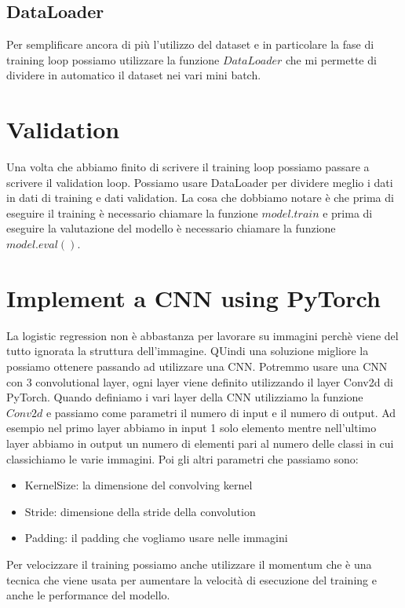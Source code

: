 \documentclass[14pt]{extreport}
\begin{document}
\subsection{DataLoader}

Per semplificare ancora di più l'utilizzo del dataset e in particolare la fase di training loop possiamo utilizzare la funzione $DataLoader$ che mi permette di dividere in automatico il dataset nei vari mini batch.

\section{Validation}

Una volta che abbiamo finito di scrivere il training loop possiamo passare a scrivere il validation loop.
Possiamo usare DataLoader per dividere meglio i dati in dati di training e dati validation.
La cosa che dobbiamo notare è che prima di eseguire il training è necessario chiamare la funzione $model.train$ e prima di eseguire la valutazione del modello è necessario chiamare la funzione $model.eval()$.

\section{Implement a CNN using PyTorch}

La logistic regression non è abbastanza per lavorare su immagini perchè viene del tutto ignorata la struttura dell'immagine. QUindi una soluzione migliore la possiamo ottenere passando ad utilizzare una CNN.
Potremmo usare una CNN con 3 convolutional layer, ogni layer viene definito utilizzando il layer Conv2d di PyTorch.
Quando definiamo i vari layer della CNN utilizziamo la funzione $Conv2d$ e passiamo come parametri il numero di input e il numero di output.
Ad esempio nel primo layer abbiamo in input 1 solo elemento mentre nell'ultimo layer abbiamo in output un numero di elementi pari al numero delle classi in cui classichiamo le varie immagini.
Poi gli altri parametri che passiamo sono:
\begin{itemize}
	\item KernelSize: la dimensione del convolving kernel
	\item Stride: dimensione della stride della convolution
	\item Padding: il padding che vogliamo usare nelle immagini 
\end{itemize}

Per velocizzare il training possiamo anche utilizzare il momentum che è una tecnica che viene usata per aumentare la velocità di esecuzione del training e anche le performance del modello.
\end{document}
